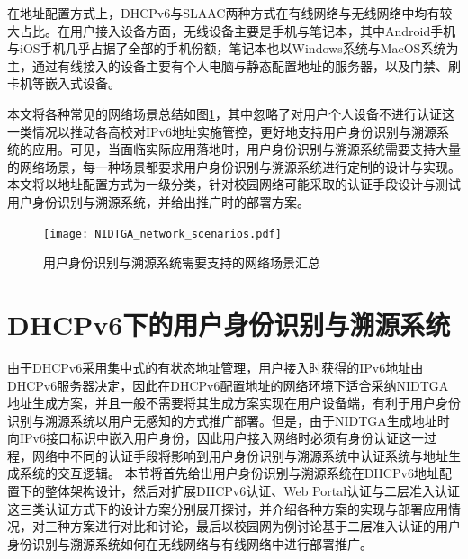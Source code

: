   在地址配置方式上，DHCPv6与SLAAC两种方式在有线网络与无线网络中均有较大占比。在用户接入设备方面，无线设备主要是手机与笔记本，其中Android手机与iOS手机几乎占据了全部的手机份额，笔记本也以Windows系统与MacOS系统为主，通过有线接入的设备主要有个人电脑与静态配置地址的服务器，以及门禁、刷卡机等嵌入式设备。
  
  本文将各种常见的网络场景总结如图\ref{fig:NIDTGA_network_scenarios}，其中忽略了对用户个人设备不进行认证这一类情况以推动各高校对IPv6地址实施管控，更好地支持用户身份识别与溯源系统的应用。可见，当面临实际应用落地时，用户身份识别与溯源系统需要支持大量的网络场景，每一种场景都要求用户身份识别与溯源系统进行定制的设计与实现。本文将以地址配置方式为一级分类，针对校园网络可能采取的认证手段设计与测试用户身份识别与溯源系统，并给出推广时的部署方案。

  \begin{figure}[ht]
    \centering
    \texttt{[image: NIDTGA\_network\_scenarios.pdf]}
    \caption{用户身份识别与溯源系统需要支持的网络场景汇总}
    \label{fig:NIDTGA_network_scenarios}
  \end{figure}


  \section{DHCPv6下的用户身份识别与溯源系统}
  \label{NIDTGA:DHCPv6}
  由于DHCPv6采用集中式的有状态地址管理，用户接入时获得的IPv6地址由DHCPv6服务器决定，因此在DHCPv6配置地址的网络环境下适合采纳NIDTGA地址生成方案，并且一般不需要将其生成方案实现在用户设备端，有利于用户身份识别与溯源系统以用户无感知的方式推广部署。但是，由于NIDTGA生成地址时向IPv6接口标识中嵌入用户身份，因此用户接入网络时必须有身份认证这一过程，网络中不同的认证手段将影响到用户身份识别与溯源系统中认证系统与地址生成系统的交互逻辑。
  本节将首先给出用户身份识别与溯源系统在DHCPv6地址配置下的整体架构设计，然后对扩展DHCPv6认证、Web Portal认证与二层准入认证这三类认证方式下的设计方案分别展开探讨，并介绍各种方案的实现与部署应用情况，对三种方案进行对比和讨论，最后以校园网为例讨论基于二层准入认证的用户身份识别与溯源系统如何在无线网络与有线网络中进行部署推广。

